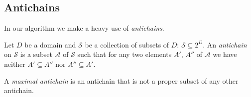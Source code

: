 %

%

\subsection{Antichains}\label{sec:antichains}
In our algorithm we make a heavy use of \emph{antichains}.

\begin{definition}\label{def:antichain}
	Let $D$ be a domain and $\mathcal{S}$ be a collection of subsets of $D$:
	$\mathcal{S}\subseteq 2^D$. An \emph{antichain} on $\mathcal{S}$ is a subset
	$\mathcal{A}$ of $\mathcal{S}$ such that for any two elements $A'$, $A''$ of
	$\mathcal{A}$ we have neither $A'\subseteq A''$ nor $A''\subseteq A'$.

	A \emph{maximal antichain} is an antichain that is not a proper subset of
	any other antichain.
\end{definition}


